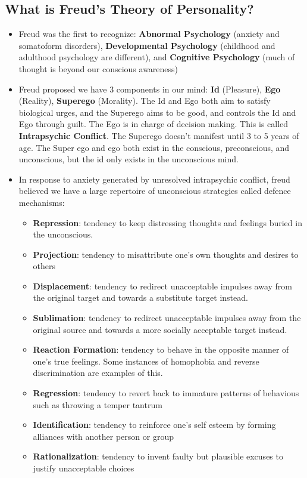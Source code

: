 \documentclass[10pt,letter]{article}
\theoremstyle{plain}
\theoremstyle{definition}
\begin{document}
\subsection*{What is Freud's Theory of Personality?}
\begin{itemize}
    \item Freud was the first to recognize: \textbf{Abnormal Psychology} (anxiety and somatoform disorders), \textbf{Developmental Psychology} (childhood and adulthood psychology are different), and \textbf{Cognitive Psychology} (much of thought is beyond our conscious awareness)
    \item Freud proposed we have 3 components in our mind: \textbf{Id} (Pleasure), \textbf{Ego} (Reality), \textbf{Superego} (Morality). The Id and Ego both aim to satisfy biological urges, and the Superego aims to be good, and controls the Id and Ego through guilt. The Ego is in charge of decision making. This is called \textbf{Intrapsychic Conflict}. The Superego doesn't manifest until 3 to 5 years of age. The Super ego and ego both exist in the conscious, preconscious, and unconscious, but the id only exists in the unconscious mind. 
    \item In response to anxiety generated by unresolved intrapsychic conflict, freud believed we have a large repertoire of unconscious strategies called defence mechanisms: 
    \begin{itemize}
        \item \textbf{Repression}: tendency to keep distressing thoughts and feelings buried in the unconscious. 
        \item \textbf{Projection}: tendency to misattribute one's own thoughts and desires to others
        \item \textbf{Displacement}: tendency to redirect unacceptable impulses away from the original target and towards a substitute target instead. 
        \item \textbf{Sublimation}: tendency to redirect unacceptable impulses away from the original source and towards a more socially acceptable target instead. 
        \item \textbf{Reaction Formation}: tendency to behave in the opposite manner of one's true feelings. Some instances of homophobia and reverse discrimination are examples of this.
        \item \textbf{Regression}: tendency to revert back to immature patterns of behavious such as throwing a temper tantrum
        \item \textbf{Identification}: tendency to reinforce one's self esteem by forming alliances with another person or group
        \item \textbf{Rationalization}: tendency to invent faulty but plausible excuses to justify unacceptable choices
    \end{itemize}
    

\end{itemize}
\end{document}
